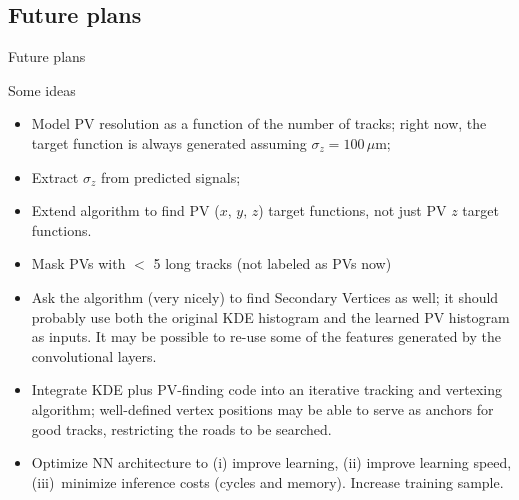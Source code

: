 \subsection{Future plans}
\begin{frame}{Future plans}
\vskip -0.10in
  \begin{block}{Some ideas}
    \begin{itemize}
        \item 
          Model PV resolution as a function of the number of tracks; right now, the target
          function is always generated assuming $ \sigma_z = 100 \, \mu $m;
        \item
          Extract $ \sigma_z $ from predicted signals;
        \item
          Extend algorithm to find PV ($ x, \, y, \, z $) target functions,
          not just PV $ z $ target functions.
        \item 
        \textcolor{brickred}{Mask PVs with $ < $ 5 long tracks (not labeled as PVs  now)} 
        \item
          Ask the algorithm (very nicely) to find Secondary Vertices as well;
          it should probably use both the original KDE histogram and the 
          learned PV histogram as inputs.
          It may be possible to re-use some of the features generated by the 
          convolutional layers.
        \item
          Integrate  KDE plus PV-finding code into an iterative tracking and vertexing
          algorithm; well-defined vertex positions may be able to serve as anchors for 
          good tracks, restricting the roads to be searched.  
        \item
          Optimize NN architecture to (i) improve learning, (ii) improve learning speed,
          (iii)~minimize inference costs (cycles and memory).
          Increase training sample.
   \end{itemize}
  \end{block}
\end{frame}





